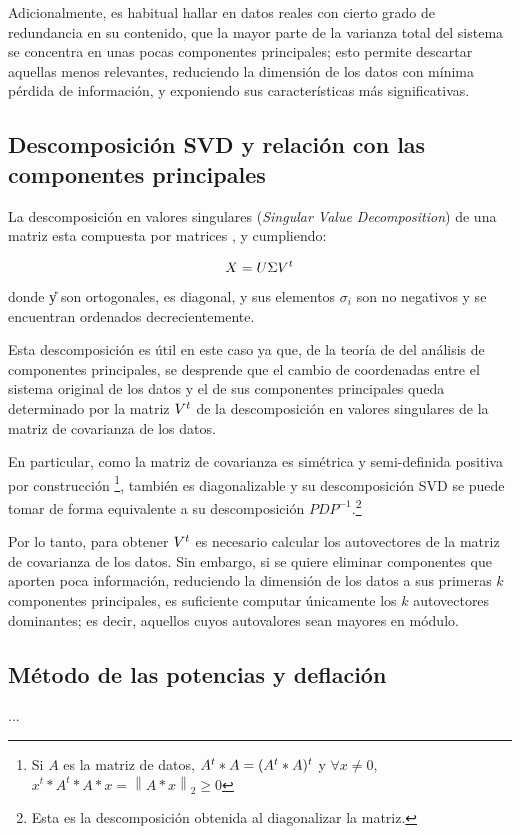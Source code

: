Adicionalmente, es habitual hallar en datos reales con cierto grado de redundancia en su contenido, que la mayor parte de la varianza total del sistema se concentra en unas pocas componentes principales; esto permite descartar aquellas menos relevantes, reduciendo la dimensión de los datos con mínima pérdida de información, y exponiendo sus características más significativas.

\subsection{Descomposición SVD y relación con las componentes principales}

La descomposición en valores singulares (\emph{Singular Value Decomposition}) de una matriz \decMat{\X}{\M}{\N} esta compuesta por matrices \decMat{\U}{\M}{\M}, \decMat{\Sig}{\M}{\N} y \decMat{\V}{\N}{\N} cumpliendo:

$$X = U \Sigma V^{t}$$

donde \U y \V son ortogonales, \Sig es diagonal, y sus elementos $\sigma_i$ son no negativos y se encuentran ordenados decrecientemente.

Esta descomposición es útil en este caso ya que, de la teoría de del análisis de componentes principales, se desprende que el cambio de coordenadas entre el sistema original de los datos y el de sus componentes principales queda determinado por la matriz $V^{t}$ de la descomposición en valores singulares de la matriz de covarianza de los datos.

En particular, como la matriz de covarianza es simétrica y semi-definida positiva por construcción \footnote{Si $A$ es la matriz de datos, $A^{t} * A = (A^{t} * A)^{t}$ y $\forall x \neq 0$, $x^t * A^t * A * x = \left \| A*x \right \|_2 \geq 0$}, también es diagonalizable y su descomposición SVD se puede tomar de forma equivalente a su descomposición $PDP^{-1}$.\footnote{Esta es la descomposición obtenida al diagonalizar la matriz.}

Por lo tanto, para obtener $V^{t}$ es necesario calcular los autovectores de la matriz de covarianza de los datos. Sin embargo, si se quiere eliminar componentes que aporten poca información, reduciendo la dimensión de los datos a sus primeras $k$ componentes principales, es suficiente computar únicamente los $k$ autovectores dominantes; es decir, aquellos cuyos autovalores sean mayores en módulo.


\subsection{Método de las potencias y deflación}

...